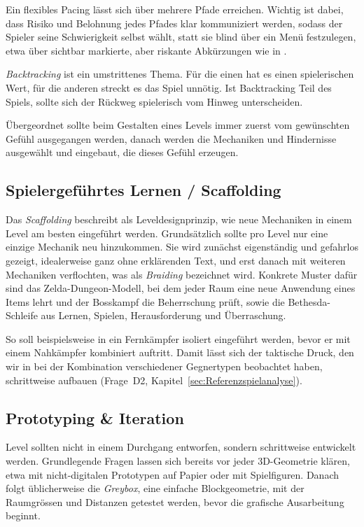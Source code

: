 \documentclass[../Main.tex]{subfiles}
\begin{document}
Ein flexibles Pacing lässt sich über mehrere Pfade erreichen. Wichtig ist dabei, dass Risiko und Belohnung jedes Pfades klar kommuniziert werden, sodass der Spieler seine Schwierigkeit selbst wählt, statt sie blind über ein Menü festzulegen, etwa über sichtbar markierte, aber riskante Abkürzungen wie in .\autocite{gdc_tenprinciples2010}

\textit{Backtracking} ist ein umstrittenes Thema. Für die einen hat es einen spielerischen Wert, für die anderen streckt es das Spiel unnötig. Ist Backtracking Teil des Spiels, sollte sich der Rückweg spielerisch vom Hinweg unterscheiden.\autocite{gdc_tenprinciples2010}

Übergeordnet sollte beim Gestalten eines Levels immer zuerst vom gewünschten Gefühl ausgegangen werden, danach werden die Mechaniken und Hindernisse ausgewählt und eingebaut, die dieses Gefühl erzeugen.\autocite{gdc_tenprinciples2010}

\subsection{Spielergeführtes Lernen / Scaffolding} \label{sec:Scaffolding}
Das \textit{Scaffolding} beschreibt als Leveldesignprinzip, wie neue Mechaniken in einem Level am besten eingeführt werden.\autocite{totten2014architectural} Grundsätzlich sollte pro Level nur eine einzige Mechanik neu hinzukommen.\autocite{gdc_tenprinciples2010} Sie wird zunächst eigenständig und gefahrlos gezeigt, idealerweise ganz ohne erklärenden Text, und erst danach mit weiteren Mechaniken verflochten, was als \textit{Braiding} bezeichnet wird.\autocite{gdc_movingmountains2020} Konkrete Muster dafür sind das Zelda-Dungeon-Modell, bei dem jeder Raum eine neue Anwendung eines Items lehrt und der Bosskampf die Beherrschung prüft, sowie die Bethesda-Schleife aus Lernen, Spielen, Herausforderung und Überraschung.\autocite{gdc_tenprinciples2010}

So soll beispielsweise in  ein Fernkämpfer isoliert eingeführt werden, bevor er mit einem Nahkämpfer kombiniert auftritt. Damit lässt sich der taktische Druck, den wir in  bei der Kombination verschiedener Gegnertypen beobachtet haben, schrittweise aufbauen (Frage~D2, Kapitel~\ref{sec:Referenzspielanalyse}).

\subsection{Prototyping \& Iteration} \label{sec:Prototyping}
Level sollten nicht in einem Durchgang entworfen, sondern schrittweise entwickelt werden. Grundlegende Fragen lassen sich bereits vor jeder 3D-Geometrie klären, etwa mit nicht-digitalen Prototypen auf Papier oder mit Spielfiguren. Danach folgt üblicherweise die \textit{Greybox}, eine einfache Blockgeometrie, mit der Raumgrössen und Distanzen getestet werden, bevor die grafische Ausarbeitung beginnt.\autocite{totten2014architectural}
\end{document}

